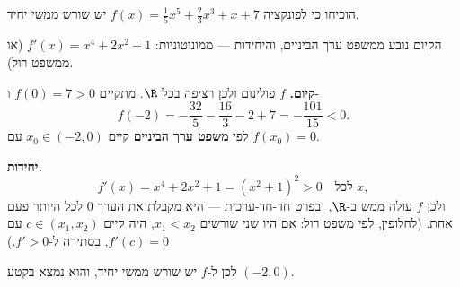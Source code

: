 
\begin{question}
הוכיחו כי לפונקציה $f(x)=\frac15x^5+\frac23x^3+x+7$ יש שורש ממשי יחיד.
\end{question}

\begin{hint}
הקיום נובע ממשפט ערך הביניים, והיחידות — ממונוטוניות: $f'(x)=x^4+2x^2+1$ (או ממשפט רול).
\end{hint}

\begin{solution}
\textbf{קיום.} $f$ פולינום ולכן רציפה בכל $\R$. מתקיים $f(0)=7>0$ ו-
\[ f(-2)=-\frac{32}{5}-\frac{16}{3}-2+7=-\frac{101}{15}<0. \]
לפי \textbf{משפט ערך הביניים} קיים $x_0\in(-2,0)$ עם $f(x_0)=0$.

\textbf{יחידות.}
\[ f'(x)=x^4+2x^2+1=(x^2+1)^2>0\quad\text{לכל } x, \]
ולכן $f$ עולה ממש ב-$\R$, ובפרט חד-חד-ערכית — היא מקבלת את הערך $0$ לכל היותר פעם אחת.
(לחלופין, לפי משפט רול: אם היו שני שורשים $x_1<x_2$, היה קיים $c\in(x_1,x_2)$ עם $f'(c)=0$, בסתירה ל-$f'>0$.)

לכן ל-$f$ יש שורש ממשי יחיד, והוא נמצא בקטע $(-2,0)$.
\end{solution}
